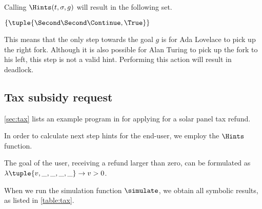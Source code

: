 Calling $\Hints(t,\sigma,g)$ will result in the following set.

$\{ \tuple{\Second\Second\Continue,\True}\}$

This means that the only step towards the goal $g$ is for Ada Lovelace to pick up the right fork.
Although it is also possible for Alan Turing to pick up the fork to his left, this step is not a valid hint.
Performing this action will result in deadlock.

\subsection{Tax subsidy request}
\label{sec:assistivetax}

\cref{sec:tax} lists an example program in \TOPHAT for applying for a solar panel tax refund.

In order to calculate next step hints for the end-user, we employ the $\Hints$ function.

The goal of the user, receiving a refund larger than zero, can be formulated as $\lambda \tuple{v,\_,\_,\_,\_}\rightarrow v>0$.

When we run the simulation function $\simulate$, we obtain all symbolic results, as listed in \cref{table:tax}.

